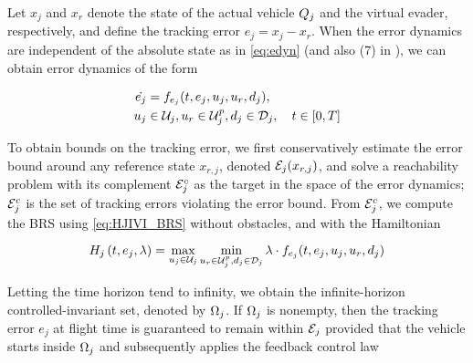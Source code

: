 

Let $x_j$ and $x_r$ denote the state of the actual vehicle $Q_j$ and the virtual evader, respectively, and define the tracking error $e_j=x_j-x_r$. When the error dynamics are independent of the absolute state as in \eqref{eq:edyn} (and also (7) in \cite{Mitchell05}), we can obtain error dynamics of the form

\vspace{-0.1in}
\begin{equation}
\label{eq:edyn} %
\begin{aligned}
\dot{e_j} &= f_{e_j}(t, e_j, u_j, u_r,d_j), \\
u_j &\in \cset_j, u_r\in\cset^p_j, d_j \in \dset_j, \quad t \in [0, T]
\end{aligned}
\end{equation}

To obtain bounds on the tracking error, we first conservatively estimate the error bound around any reference state $x_{r,j}$, denoted $\mathcal{E}_j(x_{r,j})$, and solve a reachability problem with its complement $\mathcal{E}_j^c$ as the target in the space of the error dynamics; $\mathcal{E}_j^c$ is the set of tracking errors violating the error bound. From $\mathcal{E}_j^c$, we compute the BRS using \eqref{eq:HJIVI_BRS} without obstacles, and with the Hamiltonian

\begin{equation}
\label{eq:HJIVI_track}
H_j\left(t, e_j, \lambda\right) = \max_{u_j \in \cset_j} \min_{u_r \in\cset^p_j, d_j \in \dset_j} \lambda \cdot f_{e_j}(t, e_j, u_j, u_r,d_j)
\end{equation}

Letting the time horizon tend to infinity, we obtain the infinite-horizon controlled-invariant set, denoted by $\Omega_j$. If $\Omega_j$ is nonempty, then the tracking error $e_j$ at flight time is guaranteed to remain within $\mathcal{E}_j$ provided that the vehicle starts inside $\Omega_j$ and subsequently applies the feedback control law


